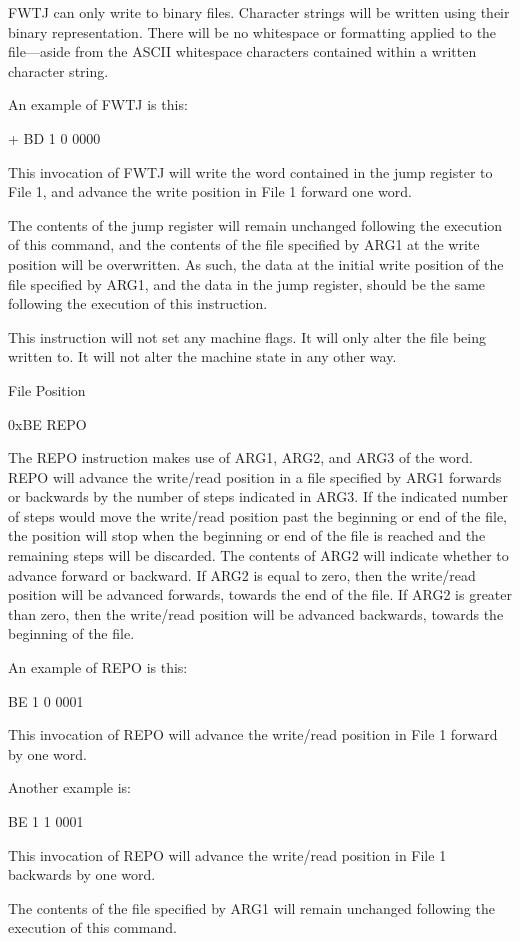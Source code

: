 \documentclass[]{article}
\begin{document}
FWTJ can only write to binary files. Character strings will be written
using their binary representation. There will be no whitespace or
formatting applied to the file---aside from the ASCII whitespace
characters contained within a written character string.

An example of FWTJ is this:

+ BD 1 0 0000

This invocation of FWTJ will write the word contained in the jump
register to File 1, and advance the write position in File 1 forward one
word.

The contents of the jump register will remain unchanged following the
execution of this command, and the contents of the file specified by
ARG1 at the write position will be overwritten. As such, the data at the
initial write position of the file specified by ARG1, and the data in
the jump register, should be the same following the execution of this
instruction.

This instruction will not set any machine flags. It will only alter the
file being written to. It will not alter the machine state in any other
way.

File Position

0xBE REPO

The REPO instruction makes use of ARG1, ARG2, and ARG3 of the word. REPO
will advance the write/read position in a file specified by ARG1
forwards or backwards by the number of steps indicated in ARG3. If the
indicated number of steps would move the write/read position past the
beginning or end of the file, the position will stop when the beginning
or end of the file is reached and the remaining steps will be discarded.
The contents of ARG2 will indicate whether to advance forward or
backward. If ARG2 is equal to zero, then the write/read position will be
advanced forwards, towards the end of the file. If ARG2 is greater than
zero, then the write/read position will be advanced backwards, towards
the beginning of the file.

An example of REPO is this:

BE 1 0 0001

This invocation of REPO will advance the write/read position in File 1
forward by one word.

Another example is:

BE 1 1 0001

This invocation of REPO will advance the write/read position in File 1
backwards by one word.

The contents of the file specified by ARG1 will remain unchanged
following the execution of this command.
\end{document}
